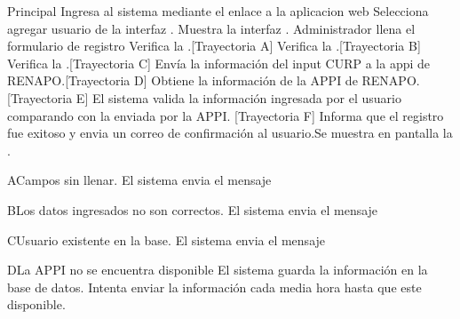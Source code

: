 	\begin{UCtrayectoria}{Principal}
	\UCpaso[\UCactor] Ingresa al sistema mediante el enlace a la aplicacion web
	 \UCpaso[\UCactor] Selecciona agregar usuario de la interfaz .
	 \UCpaso[\UCsist]Muestra la interfaz .
	  \UCpaso[\UCactor] Administrador llena el formulario de registro
	   \UCpaso[\UCsist] Verifica la  .[Trayectoria A]
	    \UCpaso[\UCsist] Verifica la  .[Trayectoria B]
	    \UCpaso[\UCsist] Verifica la .[Trayectoria C]
	  \UCpaso[\UCsist]Envía la información del input CURP a la appi de RENAPO.[Trayectoria D]
	  \UCpaso[\UCsist]Obtiene la información de la APPI de RENAPO. [Trayectoria E]
	  \UCpaso[\UCsist]El sistema valida la información ingresada por el usuario comparando con la enviada por la APPI. [Trayectoria F]
	    \UCpaso[\UCsist]Informa que el registro fue exitoso y envia un correo de confirmación al usuario.Se muestra en pantalla la .
	\end{UCtrayectoria}
		\begin{UCtrayectoriaA}{A}{Campos sin llenar.}
			\UCpaso[\UCsist] El sistema envia el mensaje 

		\end{UCtrayectoriaA}
		
		\begin{UCtrayectoriaA}{B}{Los datos ingresados no son correctos.}
			\UCpaso[\UCsist] El sistema envia el mensaje 
		
		\end{UCtrayectoriaA}	
		
		
		\begin{UCtrayectoriaA}{C}{Usuario existente en la base.}
			\UCpaso[\UCsist] El sistema envia el mensaje  

		\end{UCtrayectoriaA}
		
		
		\begin{UCtrayectoriaA}{D}{La APPI no se encuentra disponible}
			\UCpaso[\UCsist] El sistema guarda la información en la base de datos.
			\UCpaso[\UCsist]Intenta enviar la información cada media hora hasta que este disponible.
		\end{UCtrayectoriaA}
		
